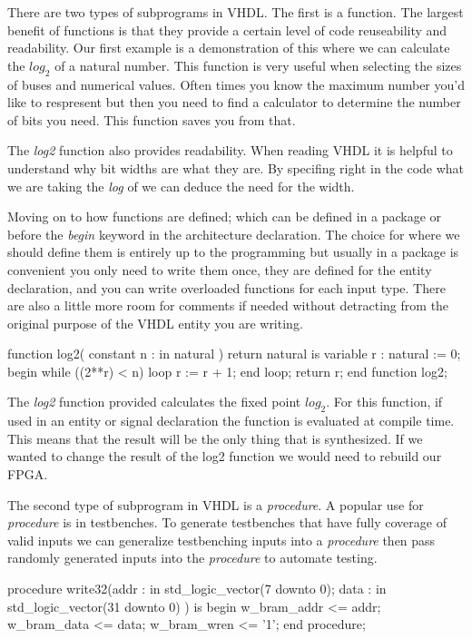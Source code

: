 There are two types of subprograms in \ac{VHDL}. The first is a function. The largest benefit of functions is that they provide a certain level of code reuseability and readability. Our first example is a demonstration of this where we can calculate the $log_2$ of a natural number. This function is very useful when selecting the sizes of buses and numerical values. Often times you know the maximum number you'd like to respresent but then you need to find a calculator to determine the number of bits you need. This function saves you from that. 

The \emph{log2} function also provides readability. When reading \ac{VHDL} it is helpful to understand why bit widths are what they are. By specifing right in the code what we are taking the \emph{log} of we can deduce the need for the width. 

Moving on to how functions are defined; which can be defined in a package or before the \emph{begin} keyword in the architecture declaration. The choice for where we should define them is entirely up to the programming but usually in a package is convenient you only need to write them once, they are defined for the entity declaration, and you can write overloaded functions for each input type. There are also a little more room for comments if needed without detracting from the original purpose of the \ac{VHDL} entity you are writing. 
	
\begin{VHDLlisting}[tabsize=8]
function log2(
	constant n : in natural
) return natural is
	variable r : natural := 0;
begin
	while ((2**r) < n) loop
		r := r + 1;
	end loop;
	return r;
end function log2;
\end{VHDLlisting}

The \emph{log2} function provided calculates the fixed point $log_2$. For this function, if used in an entity or signal declaration the function is evaluated at compile time. This means that the result will be the only thing that is synthesized. If we wanted to change the result of the log2 function we would need to rebuild our \ac{FPGA}. 

The second type of subprogram in \ac{VHDL} is a \emph{procedure}. A popular use for \emph{procedure} is in testbenches. To generate testbenches that have fully coverage of valid inputs we can generalize testbenching inputs into a \emph{procedure} then pass randomly generated inputs into the \emph{procedure} to automate testing. 

\begin{VHDLlisting}[tabsize=8]
procedure write32(addr : in std_logic_vector(7 downto 0);
				  data : in std_logic_vector(31 downto 0) ) is
begin
	w_bram_addr <= addr;
	w_bram_data <= data;
	w_bram_wren <= '1';
end procedure;
\end{VHDLlisting}

